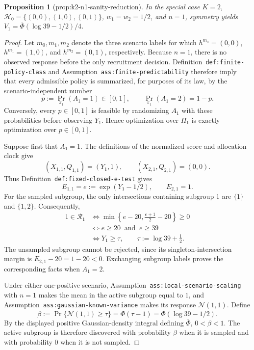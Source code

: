 \documentclass{article}
\newtheorem{proposition}{Proposition}
\begin{document}
\begin{proposition}[prop:k2-n1-sanity-reduction]\label{prop:k2-n1-sanity-reduction}
In the special case \(K=2\), \(\mathcal H_0=\{(0,0),(1,0),(0,1)\}\), \(w_1=w_2=1/2\), and \(n=1\), symmetry yields \(V_1=\overline\Phi(\log 39-1/2)/4\).
\end{proposition}
\begin{proof}
Let \(m_0,m_1,m_2\) denote the three scenario labels for which \(h^{m_0}=(0,0)\), \(h^{m_1}=(1,0)\), and \(h^{m_2}=(0,1)\), respectively.  Because \(n=1\), there is no observed response before the only recruitment decision.  Definition~\texttt{def:finite-policy-class} and Assumption~\texttt{ass:finite-predictability} therefore imply that every admissible policy is summarized, for purposes of its law, by the scenario-independent number
\[
 p:=\Pr_{\pi_1}(A_1=1)\in[0,1],
 \qquad
 \Pr_{\pi_1}(A_1=2)=1-p.
\]
Conversely, every \(p\in[0,1]\) is feasible by randomizing \(A_1\) with these probabilities before observing \(Y_1\).  Hence optimization over \(\Pi_1\) is exactly optimization over \(p\in[0,1]\).

Suppose first that \(A_1=1\).  The definitions of the normalized score and allocation clock give
\[
 (X_{1,1},Q_{1,1})=(Y_1,1),
 \qquad
 (X_{2,1},Q_{2,1})=(0,0).
\]
Thus Definition~\texttt{def:fixed-closed-e-test} gives
\[
 E_{1,1}=e:=\exp(Y_1-1/2),
 \qquad E_{2,1}=1.
\]
For the sampled subgroup, the only intersections containing subgroup \(1\) are \(\{1\}\) and \(\{1,2\}\).  Consequently,
\[
\begin{aligned}
 1\in\mathcal R_1
 &\iff \min\left\{e-20,\frac{e+1}{2}-20\right\}\geq0 \\
 &\iff e\geq20\ \text{ and }\ e\geq39 \\
 &\iff Y_1\geq \tau,
 \qquad \tau:=\log 39+\frac12.
\end{aligned}
\]
The unsampled subgroup cannot be rejected, since its singleton-intersection margin is \(E_{2,1}-20=1-20<0\).  Exchanging subgroup labels proves the corresponding facts when \(A_1=2\).

Under either one-positive scenario, Assumption~\texttt{ass:local-scenario-scaling} with \(n=1\) makes the mean in the active subgroup equal to \(1\), and Assumption~\texttt{ass:gaussian-known-variance} makes its response \(\mathcal N(1,1)\).  Define
\[
 \beta:=\Pr\{\mathcal N(1,1)\geq\tau\}
 =\overline\Phi(\tau-1)
 =\overline\Phi(\log 39-1/2).
\]
By the displayed positive Gaussian-density integral defining \(\overline\Phi\), \(0<\beta<1\).  The active subgroup is therefore discovered with probability \(\beta\) when it is sampled and with probability \(0\) when it is not sampled.


\end{proof}
\end{document}
